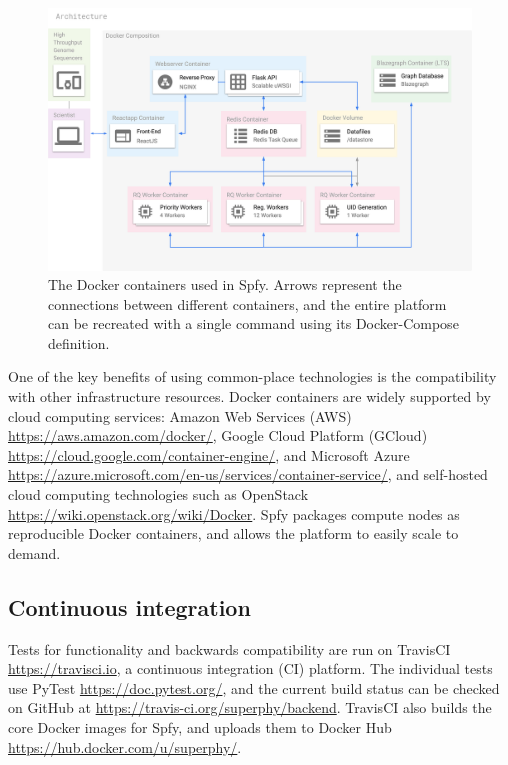 \documentclass{article}
\begin{document}
\begin{figure}[!hb]
\begin{center}
\includegraphics[width=\textwidth]{images/docker}
\end{center}
\caption{The Docker containers used in Spfy. Arrows represent the connections between different containers, and the entire platform can be recreated with a single command using its Docker-Compose definition.}
\label{fig-docker}
\end{figure}

One of the key benefits of using common-place technologies is the compatibility with other infrastructure resources.
Docker containers are widely supported by cloud computing services: Amazon Web Services (AWS) \url{https://aws.amazon.com/docker/}, Google Cloud Platform (GCloud) \url{https://cloud.google.com/container-engine/}, and Microsoft Azure \url{https://azure.microsoft.com/en-us/services/container-service/}, and self-hosted cloud computing technologies such as OpenStack \url{https://wiki.openstack.org/wiki/Docker}.
Spfy packages compute nodes as reproducible Docker containers, and allows the platform to easily scale to demand.

\subsection{Continuous integration}

Tests for functionality and backwards compatibility are run on TravisCI \url{https://travisci.io}, a continuous integration (CI) platform.
The individual tests use PyTest \url{https://doc.pytest.org/}, and the current build status can be checked on GitHub at \url{https://travis-ci.org/superphy/backend}.
TravisCI also builds the core Docker images for Spfy, and uploads them to Docker Hub \url{https://hub.docker.com/u/superphy/}.
\end{document}
